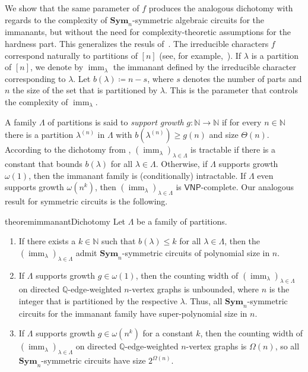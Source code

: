 \documentclass[11pt, DIV=15]{scrarticle}
\theoremstyle{definition}
\theoremstyle{plain}
\theoremstyle{remark}
\newcommand{\Sym}{\mathbf{Sym}}
\newcommand{\bbN}{\mathbb{N}}
\newcommand{\bbQ}{\mathbb{Q}}
\DeclareMathOperator{\imm}{imm}
\newcommand{\VNP}{\mathsf{VNP}}
\begin{document}
We show that the same parameter of $f$ produces the analogous
dichotomy with regards to the complexity of $\Sym_n$-symmetric
algebraic circuits for the immanants, but without the need for
complexity-theoretic assumptions for the hardness part.  This
generalizes the resuls of~\cite{dawar_symmetric_2025}.
The irreducible characters $f$ correspond naturally to partitions
of $[n]$ (see, for example,~\cite[Prop.~1.10.1]{Sagan}).  If $\lambda$ is a partition of $[n]$, we denote by $\imm_{\lambda}$ the immanant defined by the irreducible character corresponding to $\lambda$.
Let $b(\lambda) \coloneqq n-s$, where $s$ denotes the number of parts and $n$ the size of the set that is partitioned by $\lambda$. This is the parameter that controls the complexity of $\imm_{\lambda}$.

A family $\Lambda$ of partitions is said to \emph{support growth} $g \colon \bbN \to \bbN$ if for every $n \in \bbN$ there is a partition $\lambda^{(n)}$ in $\Lambda$ with $b(\lambda^{(n)}) \geq g(n)$ and size $\Theta(n)$. According to the dichotomy from \cite{curticapean2021full}, $(\imm_{\lambda})_{\lambda \in \Lambda}$ is tractable if there is a constant that bounds $b(\lambda)$ for all $\lambda \in \Lambda$. Otherwise, if $\Lambda$ supports growth $\omega(1)$, then the immanant family is (conditionally) intractable. If $\Lambda$ even supports growth $\omega(n^k)$, then $(\imm_{\lambda})_{\lambda \in \Lambda}$ is $\VNP$-complete.
Our analogous result for symmetric circuits is the following.
\begin{restatable}{theorem}{immanantDichotomy}\label{thm:immanantDichotomy}
	Let $\Lambda$ be a family of partitions.
	\begin{enumerate}
		\item If there exists a $k \in \bbN$ such that $b(\lambda) \leq k$ for all $\lambda \in \Lambda$, then the $(\imm_{\lambda})_{\lambda \in \Lambda}$ admit $\Sym_n$-symmetric circuits of polynomial size in $n$.
		\item If $\Lambda$ supports growth $g \in \omega(1)$, then the counting width of $(\imm_{\lambda})_{\lambda \in \Lambda}$ on directed $\bbQ$-edge-weighted $n$-vertex graphs is unbounded, where $n$ is the integer that is partitioned by the respective $\lambda$.
		Thus, all $\Sym_n$-symmetric circuits for the immanant family have super-polynomial size in $n$. 
		\item If $\Lambda$ supports growth $g \in \omega(n^k)$ for a constant $k$, then the counting width of $(\imm_{\lambda})_{\lambda \in \Lambda}$ on directed $\bbQ$-edge-weighted $n$-vertex graphs is $\Omega(n)$, so all $\Sym_n$-symmetric circuits have size $2^{\Omega(n)}$.
	\end{enumerate}	
\end{restatable}	
	
\end{document}
